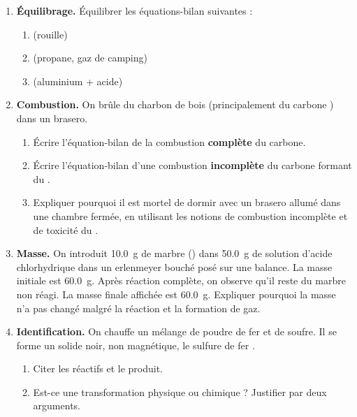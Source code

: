 \documentclass[11pt]{article}
\begin{document}
\begin{exercice}
\begin{enumerate}
\item \textbf{Équilibrage.} Équilibrer les équations-bilan suivantes :
\begin{enumerate}
\item {} (rouille)
\item {} (propane, gaz de camping)
\item {} (aluminium + acide)
\end{enumerate}
\item \textbf{Combustion.} On brûle du charbon de bois (principalement du carbone ) dans un brasero.
\begin{enumerate}
\item Écrire l'équation-bilan de la combustion \textbf{complète} du carbone.
\item Écrire l'équation-bilan d'une combustion \textbf{incomplète} du carbone formant du .
\item Expliquer pourquoi il est mortel de dormir avec un brasero allumé dans une chambre fermée, en utilisant les notions de combustion incomplète et de toxicité du .
\end{enumerate}
\item \textbf{Masse.} On introduit \SI{10,0}{g} de marbre () dans \SI{50,0}{g} de solution d'acide chlorhydrique dans un erlenmeyer bouché posé sur une balance. La masse initiale est \SI{60,0}{g}. Après réaction complète, on observe qu'il reste du marbre non réagi. La masse finale affichée est \SI{60,0}{g}. Expliquer pourquoi la masse n'a pas changé malgré la réaction et la formation de gaz.
\item \textbf{Identification.} On chauffe un mélange de poudre de fer et de soufre. Il se forme un solide noir, non magnétique, le sulfure de fer .
\begin{enumerate}
\item Citer les réactifs et le produit.
\item Est-ce une transformation physique ou chimique ? Justifier par deux arguments.
\end{enumerate}
\end{enumerate}
\end{exercice}
\end{document}
